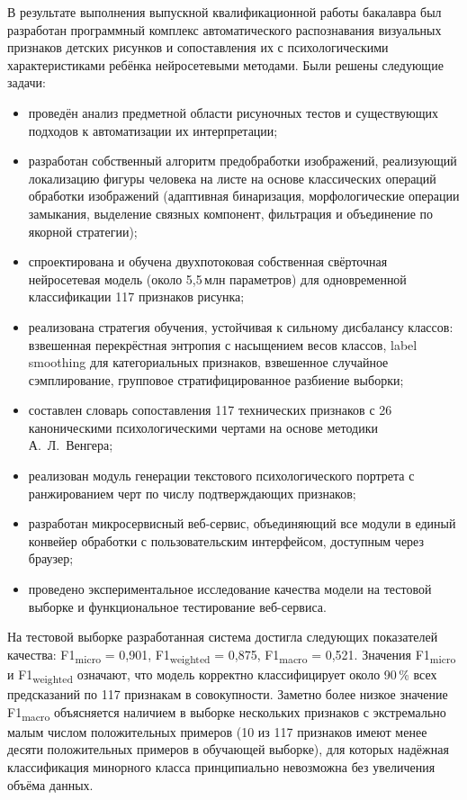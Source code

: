 \conclusion

В результате выполнения выпускной квалификационной работы бакалавра был разработан программный комплекс автоматического распознавания визуальных признаков детских рисунков и сопоставления их с психологическими характеристиками ребёнка нейросетевыми методами. Были решены следующие задачи:

\begin{itemize}
    \item проведён анализ предметной области рисуночных тестов и существующих подходов к автоматизации их интерпретации;
    \item разработан собственный алгоритм предобработки изображений, реализующий локализацию фигуры человека на листе на основе классических операций обработки изображений (адаптивная бинаризация, морфологические операции замыкания, выделение связных компонент, фильтрация и объединение по якорной стратегии);
    \item спроектирована и обучена двухпотоковая собственная свёрточная нейросетевая модель (около 5,5\,млн параметров) для одновременной классификации 117 признаков рисунка;
    \item реализована стратегия обучения, устойчивая к сильному дисбалансу классов: взвешенная перекрёстная энтропия с насыщением весов классов, label smoothing для категориальных признаков, взвешенное случайное сэмплирование, групповое стратифицированное разбиение выборки;
    \item составлен словарь сопоставления 117 технических признаков с 26 каноническими психологическими чертами на основе методики А.~Л.~Венгера;
    \item реализован модуль генерации текстового психологического портрета с ранжированием черт по числу подтверждающих признаков;
    \item разработан микросервисный веб-сервис, объединяющий все модули в единый конвейер обработки с пользовательским интерфейсом, доступным через браузер;
    \item проведено экспериментальное исследование качества модели на тестовой выборке и функциональное тестирование веб-сервиса.
\end{itemize}

На тестовой выборке разработанная система достигла следующих показателей качества: F1\textsubscript{micro} = 0,901, F1\textsubscript{weighted} = 0,875, F1\textsubscript{macro} = 0,521. Значения F1\textsubscript{micro} и F1\textsubscript{weighted} означают, что модель корректно классифицирует около 90\,\% всех предсказаний по 117 признакам в совокупности. Заметно более низкое значение F1\textsubscript{macro} объясняется наличием в выборке нескольких признаков с экстремально малым числом положительных примеров (10 из 117 признаков имеют менее десяти положительных примеров в обучающей выборке), для которых надёжная классификация минорного класса принципиально невозможна без увеличения объёма данных.

